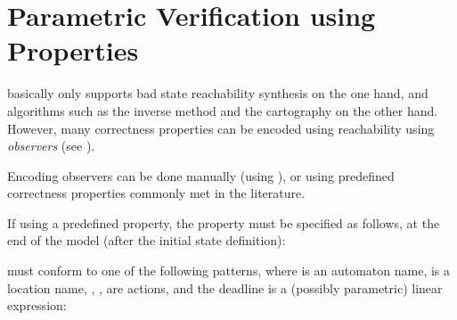 \section{Parametric Verification using Properties}\label{ss:mode:prop}

\imitator{} basically only supports bad state reachability synthesis on the one hand, and algorithms such as the inverse method and the cartography on the other hand.
However, many correctness properties can be encoded using reachability using \emph{observers} (see \cite{ABL98,ABBL98,Andre13ICECCS}).

Encoding observers can be done manually (using \adhoc{} \IPTA{}), or using predefined correctness properties commonly met in the literature.

If using a predefined property, the property must be specified as follows, at the end of the model (after the initial state definition):


\styleIMI{[PROP]} must conform to one of the following patterns, where  is an automaton name,  is a location name, , ,  are actions, and the deadline  is a (possibly parametric) linear expression:

